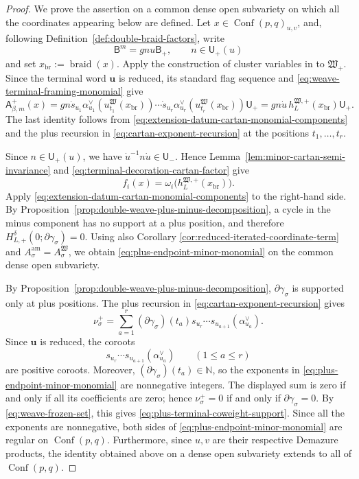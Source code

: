 \documentclass[10pt,a4paper]{article}
\theoremstyle{definition}
\theoremstyle{remark}
\newcommand{\flagA}{\mathsf{A}}
\newcommand{\flagB}{\mathsf{B}}
\newcommand{\borelB}{\mathsf{B}}
\newcommand{\unipotentU}{\mathsf{U}}
\newcommand{\Conf}{\operatorname{Conf}}
\newcommand{\fW}{\mathfrak W}
\begin{document}
\begin{proof}
We prove the assertion on a common dense open subvariety on which all the
coordinates appearing below are defined.  Let \(x\in\Conf(p,q)_{u,v}\), and,
following Definition~\ref{def:double-braid-factors}, write
\[
 \flagB^m=gn u\borelB_+,
 \qquad n\in\unipotentU_+(u)
\]
and set \(x_{\mathrm{br}}:=\operatorname{braid}(x)\).  Apply the construction
of cluster variables in
\cite[Subsection~4.1, Theorem~5.1, and Subsection~6.1]
{CasalsEtAlBraidVarieties} to \(\fW_+\).  Since the terminal word \(\mathbf u\)
is reduced, its standard flag sequence and
\eqref{eq:weave-terminal-framing-monomial} give
\begin{equation}
 \flagA_{\beta,m}^+(x)
 =gn\dot s_{u_1}\alpha_{u_1}^\vee(u_{t_1}^\fW(x_{\mathrm{br}}))
     \cdots
     \dot s_{u_r}\alpha_{u_r}^\vee(u_{t_r}^\fW(x_{\mathrm{br}}))
     \unipotentU_+
 =gn\dot u\,h_L^{\fW,+}(x_{\mathrm{br}})\unipotentU_+.
 \label{eq:terminal-decoration-cartan-factor}
\end{equation}
The last identity follows from
\eqref{eq:extension-datum-cartan-monomial-components} and the plus recursion
in \eqref{eq:cartan-exponent-recursion} at the positions \(t_1,\ldots,t_r\).

Since \(n\in\unipotentU_+(u)\), we have
\(\dot u^{-1}n\dot u\in\unipotentU_-\).  Hence
Lemma~\ref{lem:minor-cartan-semi-invariance} and
\eqref{eq:terminal-decoration-cartan-factor} give
\begin{equation}
 f_i(x)=\omega_i\bigl(h_L^{\fW,+}(x_{\mathrm{br}})\bigr).
 \label{eq:plus-endpoint-minor-cartan-evaluation}
\end{equation}
Apply \eqref{eq:extension-datum-cartan-monomial-components} to the right-hand
side.
By Proposition~\ref{prop:double-weave-plus-minus-decomposition}, a cycle in the
minus component has no support at a plus position, and therefore
\(H_{L,+}^\delta(0;\partial\gamma_\sigma)=0\).  Using also Corollary
\ref{cor:reduced-iterated-coordinate-term} and
\(A_\sigma^{\mathrm{am}}=A_\sigma^\fW\), we obtain
\eqref{eq:plus-endpoint-minor-monomial} on the common dense open
subvariety.

By Proposition~\ref{prop:double-weave-plus-minus-decomposition},
\(\partial\gamma_\sigma\) is supported only at plus positions.  The plus
recursion in \eqref{eq:cartan-exponent-recursion} gives
\[
 \nu_\sigma^+
 =\sum_{a=1}^r(\partial\gamma_\sigma)(t_a)
   s_{u_r}\cdots s_{u_{a+1}}(\alpha_{u_a}^\vee).
\]
Since \(\mathbf u\) is reduced, the coroots
\[
 s_{u_r}\cdots s_{u_{a+1}}(\alpha_{u_a}^\vee)
 \qquad(1\le a\le r)
\]
are positive coroots.  Moreover,
\((\partial\gamma_\sigma)(t_a)\in\mathbb N\), so the exponents in
\eqref{eq:plus-endpoint-minor-monomial} are nonnegative integers.
The displayed sum is zero if and only if all its coefficients are zero;
hence \(\nu_\sigma^+=0\) if and only if
\(\partial\gamma_\sigma=0\).  By
\eqref{eq:weave-frozen-set}, this gives
\eqref{eq:plus-terminal-coweight-support}.  Since all the exponents
are nonnegative, both sides of
\eqref{eq:plus-endpoint-minor-monomial} are regular on
\(\Conf(p,q)\).  Furthermore, since \(u,v\) are their respective Demazure
products, the identity obtained above on a dense open subvariety extends to
all of \(\Conf(p,q)\).
\end{proof}
\end{document}
